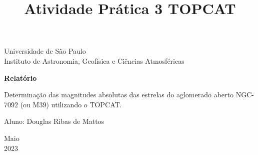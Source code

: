 \documentclass[a4paper, 12pt]{article}
\begin{document}
	\begin{titlepage}
		\begin{center}
			
			
			\Huge{Universidade de São Paulo}\\
			\large{Instituto de Astronomia, Geofísica e Ciências Atmosféricas}\\ 
			\vspace{15pt}
			
			\vspace{85pt}
			
			\textbf{\LARGE{Relatório}}
			\title{\large{Atividade Prática 3 TOPCAT}}
			
		\end{center}
		\vspace{1,5cm}
		
		\begin{flushright}
			
			\begin{list}{}{
					\setlength{\leftmargin}{4.5cm}
					\setlength{\rightmargin}{0cm}
					\setlength{\labelwidth}{0pt}
					\setlength{\labelsep}{\leftmargin}}
				
				\item Determinação das magnitudes absolutas das estrelas do aglomerado aberto NGC-7092 (ou M39) utilizando o TOPCAT.
				
				\begin{list}{}{
						\setlength{\leftmargin}{0cm}
						\setlength{\rightmargin}{0cm}
						\setlength{\labelwidth}{0pt}
						\setlength{\labelsep}{\leftmargin}}
					
					\item Aluno: Douglas Ribas de Mattos\
					
				\end{list}
			\end{list}
		\end{flushright}
		\vspace{1cm}
		\begin{center}
			\vspace{\fill}
			Maio\\
			2023
		\end{center}
	\end{titlepage}
	\newpage
	\newpage
	\tableofcontents
	\thispagestyle{empty}
	
\end{document}
